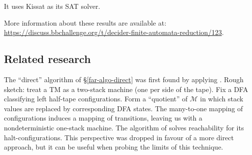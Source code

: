 It uses Kissat\cite{Biere_2020} as its \textsc{SAT} solver.

More information about these results are available at: \url{https://discuss.bbchallenge.org/t/decider-finite-automata-reduction/123}.

\subsection{Related research}
The ``direct'' algorithm of \S \ref{far-algo-direct} was first found by applying \cite{BEM_1997}.
Rough sketch: treat a TM as a two-stack machine (one per side of the tape).
Fix a DFA classifying left half-tape configurations.
Form a ``quotient'' of $\mathcal{M}$ in which stack values are replaced by corresponding DFA states.
The many-to-one mapping of configurations induces a mapping of transitions, leaving us with a nondeterministic one-stack machine.
The algorithm of \cite{BEM_1997} solves reachability for its halt-configurations.
This perspective was dropped in favour of a more direct approach, but it can be useful when probing the limits of this technique.
